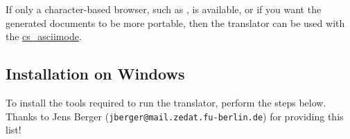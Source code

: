 %
%
\html{\\}%

If only a character-based browser, such as , is available, 
or if you want the generated documents to be more portable, 
then the translator can be used with the  
\hyperref{option}{option (see Section~}{)}{cs_asciimode}. 


\subsection{Installation on Windows}
\label{windowsinst}
To install the tools required to run the translator, perform the steps
below. Thanks to Jens Berger (\texttt{jberger@mail.zedat.fu-berlin.de})
for providing this list!
